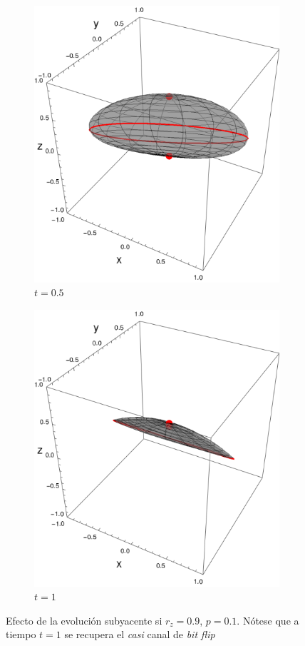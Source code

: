 \begin{figure}[ht!]
\begin{subfigure}{0.32\textwidth}
    \includegraphics[width=0.9\linewidth]{chapter3/figures_toy/sphere_CNOT_t=0.5_r=0.9_p=0.1.png}
    \caption{$t=0.5$}
  \end{subfigure}
  \begin{subfigure}{0.32\textwidth}
    \centering
    \includegraphics[width=0.9\linewidth]{chapter3/figures_toy/sphere_CNOT_t=1._r=0.9_p=0.1.png}
    \caption{$t=1$}
  \end{subfigure}
  \caption{Efecto de la evolución subyacente si $r_{z}=0.9$, $p=0.1$. Nótese que a tiempo $t=1$ se recupera el \textit{casi} canal de \textit{bit flip}}
  \label{fig:AlmostBitFlipSequence}
  \end{figure}

